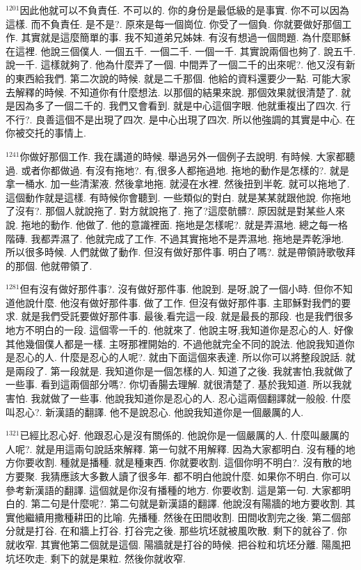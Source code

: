 \documentclass{book}
\begin{document}
$^{1201}$因此他就可以不負責任.
不可以的.
你的身份是最低級的是事實.
你不可以因為這樣.
而不負責任.
是不是?.
原來是每一個崗位.
你受了一個負.
你就要做好那個工作.
其實就是這麼簡單的事.
我不知道弟兄姊妹.
有沒有想過一個問題.
為什麼耶穌在這裡.
他說三個僕人.
一個五千.
一個二千.
一個一千.
其實說兩個也夠了.
說五千.
說一千.
這樣就夠了.
他為什麼弄了一個.
中間弄了一個二千的出來呢?.
他又沒有新的東西給我們.
第二次說的時候.
就是二千那個.
他給的資料還要少一點.
可能大家去解釋的時候.
不知道你有什麼想法.
以那個的結果來說.
那個效果就很清楚了.
就是因為多了一個二千的.
我們又會看到.
就是中心這個字眼.
他就重複出了四次.
行不行?.
良善這個不是出現了四次.
是中心出現了四次.
所以他強調的其實是中心.
在你被交托的事情上.

$^{1241}$你做好那個工作.
我在講道的時候.
舉過另外一個例子去說明.
有時候.
大家都聽過.
或者你都做過.
有沒有拖地?.
有,很多人都拖過地.
拖地的動作是怎樣的?.
就是拿一桶水.
加一些清潔液.
然後拿地拖.
就浸在水裡.
然後扭到半乾.
就可以拖地了.
這個動作就是這樣.
有時候你會聽到.
一些類似的對白.
就是某某就跟他說.
你拖地了沒有?.
那個人就說拖了.
對方就說拖了.
拖了?這麼骯髒?.
原因就是對某些人來說.
拖地的動作.
他做了.
他的意識裡面.
拖地是怎樣呢?.
就是弄濕地.
總之每一格階磚.
我都弄濕了.
他就完成了工作.
不過其實拖地不是弄濕地.
拖地是弄乾淨地.
所以很多時候.
人們就做了動作.
但沒有做好那件事.
明白了嗎?.
就是帶領詩歌敬拜的那個.
他就帶領了.

$^{1281}$但有沒有做好那件事?.
沒有做好那件事.
他說到.
是呀,說了一個小時.
但你不知道他說什麼.
他沒有做好那件事.
做了工作.
但沒有做好那件事.
主耶穌對我們的要求.
就是我們受託要做好那件事.
最後,看完這一段.
就是最長的那段.
也是我們很多地方不明白的一段.
這個零一千的.
他就來了.
他說主呀,我知道你是忍心的人.
好像其他幾個僕人都是一樣.
主呀那裡開始的.
不過他就完全不同的說法.
他說我知道你是忍心的人.
什麼是忍心的人呢?.
就由下面這個來表達.
所以你可以將整段說話.
就是兩段了.
第一段就是.
我知道你是一個怎樣的人.
知道了之後.
我就害怕,我就做了一些事.
看到這兩個部分嗎?.
你切香腸去理解.
就很清楚了.
基於我知道.
所以我就害怕.
我就做了一些事.
他說我知道你是忍心的人.
忍心這兩個翻譯就一般般.
什麼叫忍心?.
新漢語的翻譯.
他不是說忍心.
他說我知道你是一個嚴厲的人.

$^{1321}$已經比忍心好.
他跟忍心是沒有關係的.
他說你是一個嚴厲的人.
什麼叫嚴厲的人呢?.
就是用這兩句說話來解釋.
第一句就不用解釋.
因為大家都明白.
沒有種的地方你要收割.
種就是播種.
就是種東西.
你就要收割.
這個你明不明白?.
沒有散的地方要聚.
我猜應該大多數人讀了很多年.
都不明白他說什麼.
如果你不明白.
你可以參考新漢語的翻譯.
這個就是你沒有播種的地方.
你要收割.
這是第一句.
大家都明白的.
第二句是什麼呢?.
第二句就是新漢語的翻譯.
他說沒有陽牆的地方要收割.
其實他繼續用撒種耕田的比喻.
先播種.
然後在田間收割.
田間收割完之後.
第二個部分就是打谷.
在和牆上打谷.
打谷完之後.
那些坑坯就被風吹散.
剩下的就谷了.
你就收窄.
其實他第二個就是這個.
陽牆就是打谷的時候.
把谷粒和坑坯分離.
陽風把坑坯吹走.
剩下的就是果粒.
然後你就收窄.
\end{document}
